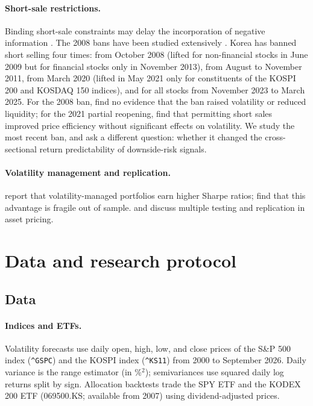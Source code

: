 \documentclass[11pt]{article}
\begin{document}
\paragraph{Short-sale restrictions.} Binding short-sale constraints may delay the incorporation of negative information \citep{miller1977,diamondverrecchia1987}. The 2008 bans have been studied extensively \citep{beberpagano2013,boehmer2013}. Korea has banned short selling four times: from October 2008 (lifted for non-financial stocks in June 2009 but for financial stocks only in November 2013), from August to November 2011, from March 2020 (lifted in May 2021 only for constituents of the KOSPI 200 and KOSDAQ 150 indices), and for all stocks from November 2023 to March 2025. For the 2008 ban, \citet{eom2021} find no evidence that the ban raised volatility or reduced liquidity; for the 2021 partial reopening, \citet{kimkim2024} find that permitting short sales improved price efficiency without significant effects on volatility. We study the most recent ban, and ask a different question: whether it changed the cross-sectional return predictability of downside-risk signals.

\paragraph{Volatility management and replication.} \citet{moreiramuir2017} report that volatility-managed portfolios earn higher Sharpe ratios; \citet{cederburg2020} find that this advantage is fragile out of sample. \citet{hlz2016} and \citet{hxz2020} discuss multiple testing and replication in asset pricing.

\section{Data and research protocol}\label{sec:data}

\subsection{Data}

\paragraph{Indices and ETFs.} Volatility forecasts use daily open, high, low, and close prices of the S\&P 500 index (\texttt{\^{}GSPC}) and the KOSPI index (\texttt{\^{}KS11}) from 2000 to September 2026. Daily variance is the \citet{parkinson1980} range estimator (in \%$^2$); semivariances use squared daily log returns split by sign. Allocation backtests trade the SPY ETF and the KODEX 200 ETF (069500.KS; available from 2007) using dividend-adjusted prices.
\end{document}
